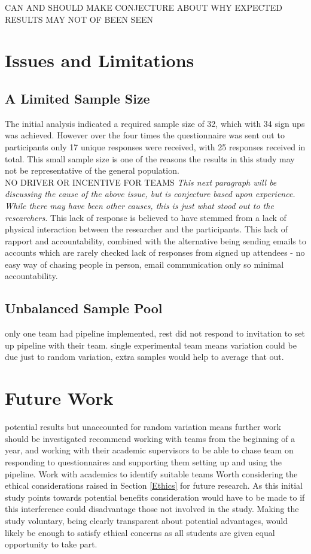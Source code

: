 \documentclass[journal]{IEEEtran}
\begin{document}
    CAN AND SHOULD MAKE CONJECTURE ABOUT WHY EXPECTED RESULTS MAY NOT OF BEEN SEEN

\section{Issues and Limitations} \label{IssuesandLimitations}
    \subsection{A Limited Sample Size}
        The initial analysis indicated a required sample size of 32, which with 34 sign ups was achieved. However over the four times the questionnaire was sent out to participants only 17 unique responses were received, with 25 responses received in total. This small sample size is one of the reasons the results in this study may not be representative of the general population. \\

        NO DRIVER OR INCENTIVE FOR TEAMS
        \textit{This next paragraph will be discussing the cause of the above issue, but is conjecture based upon experience. While there may have been other causes, this is just what stood out to the researchers.} This lack of response is believed to have stemmed from a lack of physical interaction between the researcher and the participants. This lack of rapport and accountability, combined with the alternative being sending emails to accounts which are rarely checked
        lack of responses from signed up attendees - no easy way of chasing people in person, email communication only so minimal accountability.

    \subsection{Unbalanced Sample Pool}
        only one team had pipeline implemented, rest did not respond to invitation to set up pipeline with their team.
        single experimental team means variation could be due just to random variation, extra samples would help to average that out.

\section{Future Work}
    potential results but unaccounted for random variation means further work should be investigated
    recommend working with teams from the beginning of a year, and working with their academic supervisors to be able to chase team on responding to questionnaires and supporting them setting up and using the pipeline. Work with academics to identify suitable teams
    Worth considering the ethical considerations raised in Section \ref{Ethics} for future research. As this initial study points towards potential benefits consideration would have to be made to if this interference could disadvantage those not involved in the study. Making the study voluntary, being clearly transparent about potential advantages, would likely be enough to satisfy ethical concerns as all students are given equal opportunity to take part. 
\end{document}

